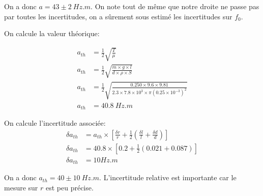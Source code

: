 \documentclass[11pt]{article}
\begin{document}
On a donc $a=43 \pm 2 \ Hz.m$. On note tout de même que notre droite ne passe pas par toutes les incertitudes, on a sûrement sous estimé les incertitudes sur $f_0$.

\newpage
On calcule la valeur théorique:

\begin{align*}
    a_{th} &= \frac{1}{2} \sqrt{\frac{T}{\mu}}\\
    a_{th}&=\frac{1}{2} \sqrt{\frac{m \times g \times l}{d \times \rho \times S}} \\
    a_{th}&=\frac{1}{2} \sqrt{\frac{0.250 \times 9.6 \times 9.81}{2.3 \times 7.8 \times 10^{3} \times \pi (0.25 \times 10^{-3})^2}} \\
    a_{th}&= 40.8 \ Hz.m
\end{align*}

On calcule l'incertitude associée:
\begin{align*}
    \delta a_{th} &= a_{th} \times [\frac{\delta r}{r}+\frac{1}{2}\left(\frac{\delta l}{l}+ \frac{\delta d}{d}\right)] \\
    \delta a_{th} &= 40.8 \times [0.2 + \frac{1}{2}\left(0.021+0.087\right)] \\
    \delta a_{th} &= 10 Hz.m
\end{align*}

On a donc $a_{th}=40\pm 10 \ Hz.m$. L'incertitude relative est importante car le mesure sur $r$ est peu précise. 
\end{document}
